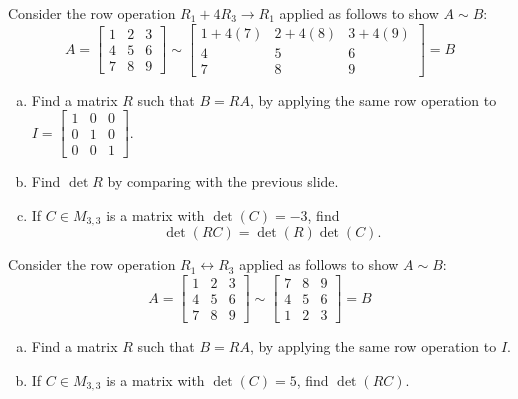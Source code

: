 \begin{applicationActivities}
\begin{activity}{5}
Consider the row operation \(R_1+4R_3\to R_1\) applied as follows to show
\(A\sim B\):
\[
A=\begin{bmatrix}1&2&3\\4&5&6\\7&8&9\end{bmatrix}
  \sim
\begin{bmatrix}1+4(7)&2+4(8)&3+4(9)\\4&5&6\\7&8&9\end{bmatrix}=B
\]
\begin{enumerate}[(a)]
\item Find a matrix \(R\) such that \(B=RA\), by applying the same row operation to 
\(I=\begin{bmatrix}1&0&0\\0&1&0\\0&0&1\end{bmatrix}\).
\item Find \(\det R\) by comparing with the previous slide.
\item If \(C \in M_{3,3}\) is a matrix with \(\det(C)= -3\), find 
\[\det(RC)=\det(R)\det(C).\]
\end{enumerate}
\end{activity}

\begin{activity}{5}
Consider the row operation \(R_1\leftrightarrow R_3\) applied as follows to show
\(A\sim B\):
\[
A=\begin{bmatrix}1&2&3\\4&5&6\\7&8&9\end{bmatrix}
  \sim
\begin{bmatrix}7&8&9\\4&5&6\\1&2&3\end{bmatrix}=B
\]
\begin{enumerate}[(a)]
\item Find a matrix \(R\) such that \(B=RA\), by applying the same row operation to \(I\).
\item If \(C \in M_{3,3}\) is a matrix with \(\det(C)= 5\), find \(\det(RC)\).
\end{enumerate}
\end{activity}


\end{applicationActivities}
